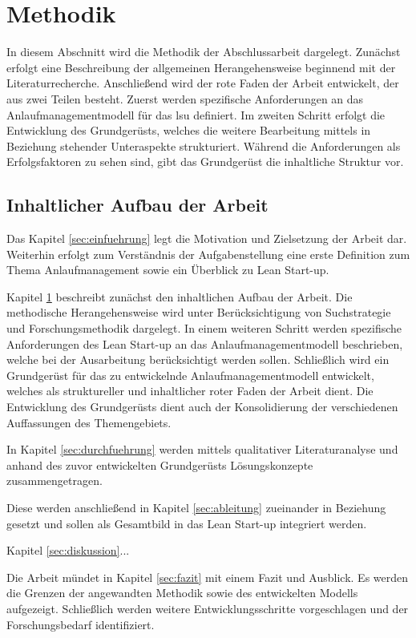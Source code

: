 \chapter{Methodik}\label{sec:methodik}
In diesem Abschnitt wird die Methodik der Abschlussarbeit dargelegt. Zunächst erfolgt eine Beschreibung der allgemeinen Herangehensweise beginnend mit der Literaturrecherche. Anschließend wird der rote Faden der Arbeit entwickelt, der aus zwei Teilen besteht. Zuerst werden spezifische Anforderungen an das Anlaufmanagementmodell für das \gls{lsu} definiert. Im zweiten Schritt erfolgt die Entwicklung des Grundgerüsts, welches die weitere Bearbeitung mittels in Beziehung stehender Unteraspekte strukturiert. Während die Anforderungen als Erfolgsfaktoren zu sehen sind, gibt das Grundgerüst die inhaltliche Struktur vor.  

\section{Inhaltlicher Aufbau der Arbeit}
Das Kapitel \ref{sec:einfuehrung} legt die Motivation und Zielsetzung der Arbeit dar. Weiterhin erfolgt zum Verständnis der Aufgabenstellung eine erste Definition zum Thema Anlaufmanagement sowie ein Überblick zu Lean Start-up. 

Kapitel \ref{sec:methodik} beschreibt zunächst den inhaltlichen Aufbau der Arbeit. Die methodische Herangehensweise wird unter Berücksichtigung von Suchstrategie und Forschungsmethodik dargelegt. In einem weiteren Schritt werden spezifische Anforderungen des Lean Start-up an das Anlaufmanagementmodell beschrieben, welche bei der Ausarbeitung berücksichtigt werden sollen. Schließlich wird ein Grundgerüst für das zu entwickelnde Anlaufmanagementmodell entwickelt, welches als struktureller und inhaltlicher roter Faden der Arbeit dient. %
Die Entwicklung des Grundgerüsts dient auch der Konsolidierung der verschiedenen Auffassungen des Themengebiets. 

In Kapitel \ref{sec:durchfuehrung} werden mittels qualitativer Literaturanalyse und anhand des zuvor entwickelten Grundgerüsts Lösungskonzepte zusammengetragen. 

Diese werden anschließend in Kapitel \ref{sec:ableitung} zueinander in Beziehung gesetzt und sollen als Gesamtbild in das Lean Start-up integriert werden. 

Kapitel \ref{sec:diskussion}...

Die Arbeit mündet in Kapitel \ref{sec:fazit} mit einem Fazit und Ausblick. Es werden die Grenzen der angewandten Methodik sowie des entwickelten Modells aufgezeigt. Schließlich werden weitere Entwicklungsschritte vorgeschlagen und der Forschungsbedarf identifiziert. 

